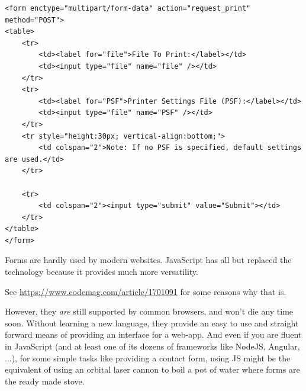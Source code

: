 
\begin{frame}[fragile]
%
\begin{codebox}
\begin{verbatim}
<form enctype="multipart/form-data" action="request_print" method="POST">
<table>
    <tr>
        <td><label for="file">File To Print:</label></td>
        <td><input type="file" name="file" /></td>
    </tr>
    <tr>
        <td><label for="PSF">Printer Settings File (PSF):</label></td>
        <td><input type="file" name="PSF" /></td>
    </tr>
    <tr style="height:30px; vertical-align:bottom;">
        <td colspan="2">Note: If no PSF is specified, default settings are used.</td>
    </tr>

    <tr>
        <td colspan="2"><input type="submit" value="Submit"></td>
    </tr>
</table>
</form>
\end{verbatim}
\end{codebox}
%
\end{frame}


\begin{frame}
%
\begin{hintbox}
Forms are hardly used by modern websites. JavaScript has all but replaced the technology because it provides much more versatility.

\vspace{3pt}
See \url{https://www.codemag.com/article/1701091} for some reasons why that is.

\vspace{3pt}
However, they \emph{are} still supported by common browsers, and won't die any time soon.
Without learning a new language, they provide an easy to use and straight forward means of providing an interface for a web-app.
And even if you are fluent in JavaScript (and at least one of its dozens of frameworks like NodeJS, Angular, ...), for some simple tasks like providing a contact form, using JS might be the equivalent of using an orbital laser cannon to boil a pot of water where forms are the ready made stove.
\end{hintbox}
%
\end{frame}


